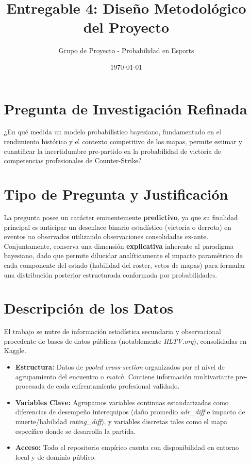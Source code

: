 \documentclass[12pt, a4paper]{article}
\title{\textbf{Entregable 4: Diseño Metodológico del Proyecto}}
\author{Grupo de Proyecto - Probabilidad en Esports}
\date{\today}
\begin{document}
\maketitle

\section{Pregunta de Investigación Refinada}
¿En qué medida un modelo probabilístico bayesiano, fundamentado en el rendimiento histórico y el contexto competitivo de los mapas, permite estimar y cuantificar la incertidumbre pre-partido en la probabilidad de victoria de competencias profesionales de Counter-Strike?

\section{Tipo de Pregunta y Justificación}
La pregunta posee un carácter eminentemente \textbf{predictivo}, ya que su finalidad principal es anticipar un desenlace binario estadístico (victoria o derrota) en eventos no observados utilizando observaciones consolidadas ex-ante. Conjuntamente, conserva una dimensión \textbf{explicativa} inherente al paradigma bayesiano, dado que permite dilucidar analíticamente el impacto paramétrico de cada componente del estado (habilidad del roster, vetos de mapas) para formular una distribución posterior estructurada conformada por probabilidades.

\section{Descripción de los Datos}
El trabajo se nutre de información estadística secundaria y observacional procedente de bases de datos públicas (notablemente \textit{HLTV.org}), consolidadas en Kaggle.
\begin{itemize}
    \item \textbf{Estructura:} Datos de \textit{pooled cross-section} organizados por el nivel de agrupamiento del encuentro o \textit{match}. Contiene información multivariante pre-procesada de cada enfrentamiento profesional validado.
    \item \textbf{Variables Clave:} Agrupamos variables continuas estandarizadas como diferencias de desempeño interequipos (daño promedio \textit{adr\_diff} e impacto de muerte/habilidad \textit{rating\_diff}), y variables discretas tales como el mapa específico donde se desarrolla la partida. 
    \item \textbf{Acceso:} Todo el repositorio empírico cuenta con disponibilidad en entorno local y de dominio público.
\end{itemize}
\end{document}
